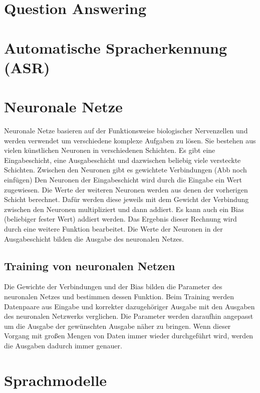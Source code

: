 
\section{Question Answering}

\section{Automatische Spracherkennung (ASR)}

\section{Neuronale Netze}
Neuronale Netze basieren auf der Funktionsweise biologischer Nervenzellen und werden verwendet um verschiedene komplexe Aufgaben zu lösen.
Sie bestehen aus vielen künstlichen Neuronen in verschiedenen Schichten.
Es gibt eine Eingabeschicht, eine Ausgabeschicht und dazwischen beliebig viele versteckte Schichten.
Zwischen den Neuronen gibt es gewichtete Verbindungen (Abb noch einfügen)
Den Neuronen der Eingabeschicht wird durch die Eingabe ein Wert zugewiesen.
Die Werte der weiteren Neuronen werden aus denen der vorherigen Schicht berechnet.
Dafür werden diese jeweils mit dem Gewicht der Verbindung zwischen den Neuronen multipliziert und dann addiert.
Es kann auch ein Bias (beliebiger fester Wert) addiert werden.
Das Ergebnis dieser Rechnung wird durch eine weitere Funktion bearbeitet.
Die Werte der Neuronen in der Ausgabeschicht bilden die Ausgabe des neuronalen Netzes.

\subsection{Training von neuronalen Netzen}
Die Gewichte der Verbindungen und der Bias bilden die Parameter des neuronalen Netzes und bestimmen dessen Funktion.
Beim Training werden Datenpaare aus Eingabe und korrekter dazugehöriger Ausgabe mit den Ausgaben des neuronalen Netzwerks verglichen.
Die Parameter werden daraufhin angepasst um die Ausgabe der gewünschten Ausgabe näher zu bringen.
Wenn dieser Vorgang mit großen Mengen von Daten immer wieder durchgeführt wird, werden die Ausgaben dadurch immer genauer.

\section{Sprachmodelle}

